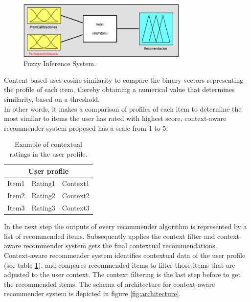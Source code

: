 \begin{figure}
\captionsetup{justification=centering,margin=2cm,font=footnotesize}
\centering
\setlength\fboxsep{0pt}
\setlength\fboxrule{0.7pt}
\includegraphics[width=0.75\textwidth]{img/fis.png}
\caption{Fuzzy Inference System.}
\label{fig:fis}   
\end{figure}
Content-based uses cosine similarity to compare the binary
vectors representing the profile of each item, thereby obtaining a
numerical value that determines similarity, based on a threshold. \\   In
other words, it makes a comparison of profiles of each item to
determine the most similar to items the user has rated with highest
score, context-aware recommender system proposed has a scale from 1 to
5. 
\begin{table}[htb]
\small
\centering
\captionsetup{font=footnotesize}
\caption{Example of contextual ratings in the user profile.}
\label{tab:2}
\small
\begin{tabular}{lll}
\hline
\multicolumn{3}{c}{User profile} \\ \hline
Item1 & Rating1 & Context1 \\ 
Item2 & Rating2 & Context2 \\ 
Item3 & Rating3 & Context3 \\ \hline
\end{tabular}
\end{table}
In the next step the outputs of every recommender algorithm is
represented by a list of recommended items. Subsequently applies the
context filter and context-aware recommender system gets the final
contextual recommendations. \\   Context-aware
recommender system identifies contextual data of the user profile (see
table \ref{tab:2}), and compares recommended items to filter those
items that are adjusted to the user context. 
The context filtering is the last step before to get the recommended
items. The schema of architecture for context-aware recommender system
is depicted in figure \ref{fig:architecture}.
